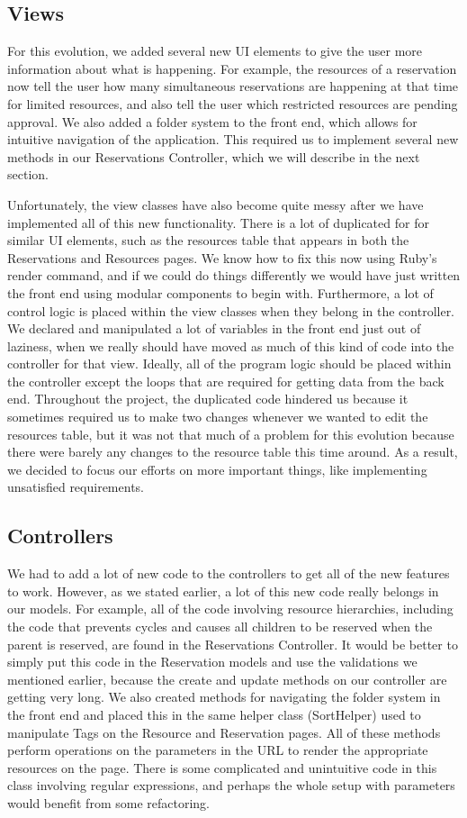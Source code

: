 \documentclass{article}
\begin{document}
\subsection{Views}
For this evolution, we added several new UI elements to give the user more information about what is happening.  For example, the resources of a reservation now tell the user how many simultaneous reservations are happening at that time for limited resources, and also tell the user which restricted resources are pending approval.  We also added a folder system to the front end, which allows for intuitive navigation of the application.  This required us to implement several new methods in our Reservations Controller, which we will describe in the next section.\par
Unfortunately, the view classes have also become quite messy after we have implemented all of this new functionality.  There is a lot of duplicated for for similar UI elements, such as the resources table that appears in both the Reservations and Resources pages.  We know how to fix this now using Ruby's render command, and if we could do things differently we would have just written the front end using modular components to begin with.  Furthermore, a lot of control logic is placed within the view classes when they belong in the controller.  We declared and manipulated a lot of variables in the front end just out of laziness, when we really should have moved as much of this kind of code into the controller for that view.  Ideally, all of the program logic should be placed within the controller except the loops that are required for getting data from the back end.  Throughout the project, the duplicated code hindered us because it sometimes required us to make two changes whenever we wanted to edit the resources table, but it was not that much of a problem for this evolution because there were barely any changes to the resource table this time around.  As a result, we decided to focus our efforts on more important things, like implementing unsatisfied requirements. \par
\subsection{Controllers}
We had to add a lot of new code to the controllers to get all of the new features to work.  However, as we stated earlier, a lot of this new code really belongs in our models.  For example, all of the code involving resource hierarchies, including the code that prevents cycles and causes all children to be reserved when the parent is reserved, are found in the Reservations Controller.  It would be better to simply put this code in the Reservation models and use the validations we mentioned earlier, because the create and update methods on our controller are getting very long.  We also created methods for navigating the folder system in the front end and placed this in the same helper class (SortHelper) used to manipulate Tags on the Resource and Reservation pages.  All of these methods perform operations on the parameters in the URL to render the appropriate resources on the page.  There is some complicated and unintuitive code in this class involving regular expressions, and perhaps the whole setup with parameters would benefit from some refactoring.
\end{document}
